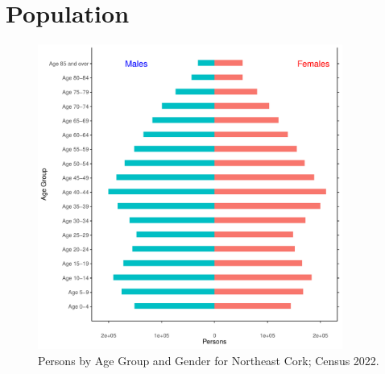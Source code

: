 \documentclass{article}
\begin{document}
\pagebreak

\section{Population} 
\label{sect:Pop}

\begin{figure}[h]
	\centering
	\includegraphics[width = 100mm]{../figures/PyramidPlot.pdf}
	\caption{Persons by Age Group and Gender for Northeast Cork; Census 2022.}
	\label{fig:2ae19629-1a6a-13a3-e055-000000000001}
	\end{figure}
\end{document}
